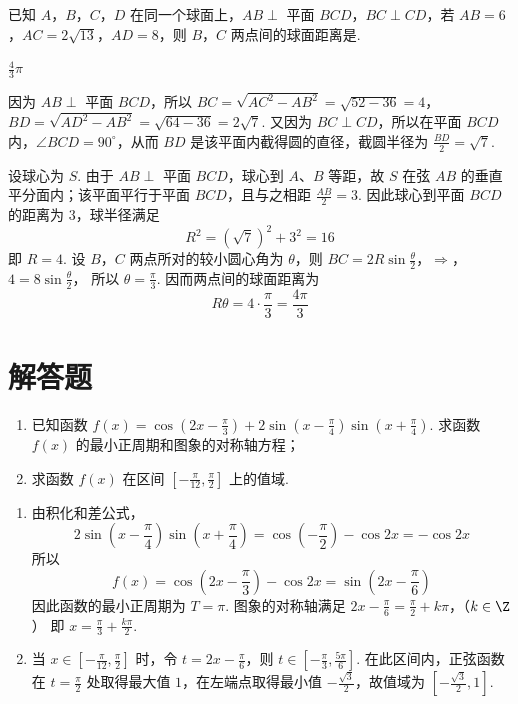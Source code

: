 \begin{problem}
已知 \(A\)，\(B\)，\(C\)，\(D\) 在同一个球面上，\(AB \perp\) 平面 \(BCD\)，\(BC \perp CD\)，若 \(AB = 6\)，\(AC = 2\sqrt{13}\)，\(AD = 8\)，则 \(B\)，\(C\) 两点间的球面距离是\fillinblank{}.
\end{problem}

\begin{answer}
\(\frac{4}{3}\pi\)
\end{answer}

\begin{solution}
因为 \(AB\perp\) 平面 \(BCD\)，所以
\(BC=\sqrt{AC^2-AB^2}=\sqrt{52-36}=4\)，\(BD=\sqrt{AD^2-AB^2}=\sqrt{64-36}=2\sqrt7\).
又因为 \(BC\perp CD\)，所以在平面 \(BCD\) 内，\(\angle BCD=90^{\circ}\)，从而 \(BD\) 是该平面内截得圆的直径，截圆半径为 \(\frac{BD}{2}=\sqrt7\).

设球心为 \(S\). 由于 \(AB\perp\) 平面 \(BCD\)，球心到 \(A\)、\(B\) 等距，故 \(S\) 在弦 \(AB\) 的垂直平分面内；该平面平行于平面 \(BCD\)，且与之相距 \(\frac{AB}{2}=3\). 因此球心到平面 \(BCD\) 的距离为 \(3\)，球半径满足
\[
R^2=\left(\sqrt7\right)^2+3^2=16
\]
即 \(R=4\). 设 \(B\)，\(C\) 两点所对的较小圆心角为 \(\theta\)，则
\(BC=2R\sin\frac{\theta}{2}\)，\(\Longrightarrow\)，\(4=8\sin\frac{\theta}{2}\)，
所以 \(\theta=\frac\pi3\). 因而两点间的球面距离为
\[
R\theta=4\cdot\frac\pi3=\frac{4\pi}{3}
\]
\end{solution}

\section{解答题}

\begin{problem}
\begin{enumerate}
\item 已知函数 \( f(x) = \cos \left(2x - \frac{\pi}{3}\right) + 2\sin \left(x - \frac{\pi}{4}\right)\sin \left(x + \frac{\pi}{4}\right) \). 求函数 \( f(x) \) 的最小正周期和图象的对称轴方程；
\item 求函数 \( f(x) \) 在区间 \( \left[-\frac{\pi}{12}, \frac{\pi}{2}\right] \) 上的值域.
\end{enumerate}
\end{problem}

\begin{solution}
\begin{enumerate}
\item
由积化和差公式，
\[
2\sin\left(x-\frac\pi4\right)\sin\left(x+\frac\pi4\right)
=\cos\left(-\frac\pi2\right)-\cos2x=-\cos2x
\]
所以
\[
f(x)=\cos\left(2x-\frac\pi3\right)-\cos2x
=\sin\left(2x-\frac\pi6\right)
\]
因此函数的最小正周期为 \(T=\pi\). 图象的对称轴满足
\(2x-\frac\pi6=\frac\pi2+k\pi\)，（\(k\in\Z\)）
即 \(x=\frac\pi3+\frac{k\pi}{2}\).

\item
当 \(x\in\left[-\frac\pi{12},\frac\pi2\right]\) 时，令 \(t=2x-\frac\pi6\)，则 \(t\in\left[-\frac\pi3,\frac{5\pi}6\right]\). 在此区间内，正弦函数在 \(t=\frac\pi2\) 处取得最大值 \(1\)，在左端点取得最小值 \(-\frac{\sqrt3}{2}\)，故值域为 \(\left[-\frac{\sqrt3}{2},1\right]\).
\end{enumerate}
\end{solution}

